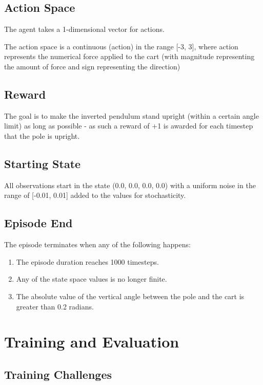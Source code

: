 \documentclass{article} %
\begin{document}
\subsection{Action Space}
The agent takes a 1-dimensional vector for actions.

The action space is a continuous (action) in the range [-3, 3], where action represents the numerical force applied to the cart (with magnitude representing the amount of force and sign representing the direction)

\subsection{Reward}
The goal is to make the inverted pendulum stand upright (within a certain angle limit) as long as possible - as such a reward of +1 is awarded for each timestep that the pole is upright.

\subsection{Starting State}
All observations start in the state (0.0, 0.0, 0.0, 0.0) with a uniform noise in the range of [-0.01, 0.01] added to the values for stochasticity.

\subsection{Episode End}
The episode terminates when any of the following happens: \begin{enumerate}
\item The episode duration reaches 1000 timesteps.
\item Any of the state space values is no longer finite.
\item The absolute value of the vertical angle between the pole and the cart is greater than 0.2 radians.
\end{enumerate}

\section{Training and Evaluation}

\subsection{Training Challenges}
\end{document}
